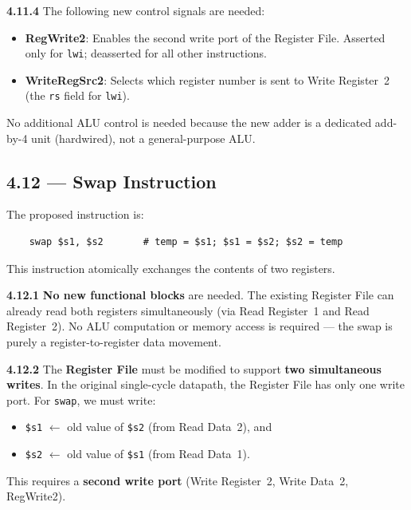 \medskip\noindent\textbf{4.11.4}
The following new control signals are needed:
\begin{itemize}
  \item \textbf{RegWrite2}: Enables the second write port of the Register File.
        Asserted only for \texttt{lwi}; deasserted for all other instructions.
  \item \textbf{WriteRegSrc2}: Selects which register number is sent to Write
        Register~2 (the \texttt{rs} field for \texttt{lwi}).
\end{itemize}
No additional ALU control is needed because the new adder is a dedicated
add-by-4 unit (hardwired), not a general-purpose ALU.

\subsection*{4.12 --- Swap Instruction}
\hypertarget{sol-4.12}{}

The proposed instruction is:
\begin{verbatim}
    swap $s1, $s2       # temp = $s1; $s1 = $s2; $s2 = temp
\end{verbatim}

This instruction atomically exchanges the contents of two registers.

\medskip\noindent\textbf{4.12.1}
\textbf{No new functional blocks} are needed. The existing Register File can
already read both registers simultaneously (via Read Register~1 and Read
Register~2). No ALU computation or memory access is required --- the swap is
purely a register-to-register data movement.

\medskip\noindent\textbf{4.12.2}
The \textbf{Register File} must be modified to support \textbf{two simultaneous
writes}. In the original single-cycle datapath, the Register File has only one
write port. For \texttt{swap}, we must write:
\begin{itemize}
  \item \texttt{\$s1} $\leftarrow$ old value of \texttt{\$s2} (from Read
        Data~2), and
  \item \texttt{\$s2} $\leftarrow$ old value of \texttt{\$s1} (from Read
        Data~1).
\end{itemize}
This requires a \textbf{second write port} (Write Register~2, Write Data~2,
RegWrite2).

